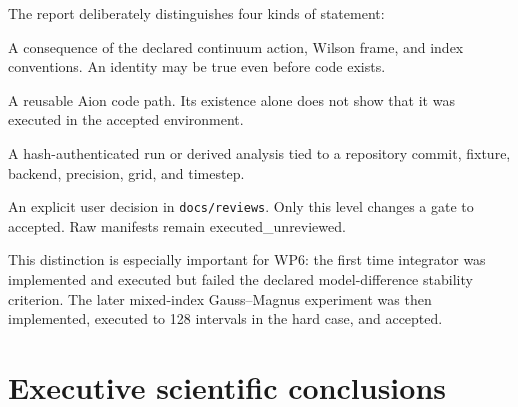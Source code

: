 \documentclass[11pt]{article}
\newcommand{\status}[1]{\textsf{#1}}
\begin{document}
The report deliberately distinguishes four kinds of statement:

\begin{description}[style=nextline]
  \item[Mathematical identity]
  A consequence of the declared continuum action, Wilson frame, and index
  conventions.  An identity may be true even before code exists.
  \item[Implemented feature]
  A reusable Aion code path.  Its existence alone does not show that it was
  executed in the accepted environment.
  \item[Executed numerical evidence]
  A hash-authenticated run or derived analysis tied to a repository commit,
  fixture, backend, precision, grid, and timestep.
  \item[Reviewed evidence]
  An explicit user decision in \texttt{docs/reviews}.  Only this level changes
  a gate to accepted.  Raw manifests remain \status{executed\_unreviewed}.
\end{description}

This distinction is especially important for WP6: the first time integrator
was implemented and executed but failed the declared model-difference
stability criterion.  The later mixed-index Gauss--Magnus experiment was then
implemented, executed to 128 intervals in the hard case, and accepted.

\section{Executive scientific conclusions}
\end{document}
